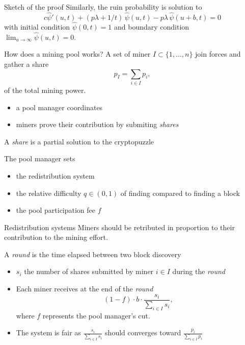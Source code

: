 \documentclass{beamer}
\begin{document}
\begin{frame}[allowframebreaks]{Sketch of the proof}
Similarly, the ruin probability is solution to 
\begin{equation*}\label{psii}
c\widehat{\psi}'(u,t)+(p \lambda+1/t)\,\widehat{\psi}(u,t)-p \lambda\,\widehat{\psi}(u+b,t)=0
\end{equation*}
with initial condition $\widehat{\psi}(0,t)=1$ and boundary condition $\lim_{u\to\infty}\widehat{\psi}(u,t)=0$.
\end{frame}
\begin{frame}{How does a mining pool works?}
\scriptsize
A set of miner $I\subset\{1,\ldots, n\}$ join forces and gather a share 
$$
p_I = \sum_{i\in I }p_i,
$$
of the total mining power. 
\begin{itemize}
  \item a pool manager coordinates
  \item miners prove their contribution by submiting \textit{shares}  
\end{itemize}
\begin{tcolorbox}[enhanced,drop shadow, title=Definition (share)]
A \textit{share} is a partial solution to the cryptopuzzle
\end{tcolorbox}
The pool manager sets
\begin{itemize} 
  \item the redistribution system
  \item the relative difficulty $q\in(0,1)$ of finding compared to finding a block
  \item the pool participation fee $f$
  \end{itemize} 
\end{frame}
\begin{frame}{Redistribution systems}
\scriptsize
Miners should be retributed in proportion to their contribution to the mining effort. 
\begin{tcolorbox}[enhanced,drop shadow, title=Proportional reward system]
A \textit{round} is the time elapsed between two block discovery
\begin{itemize} 
  \item $s_i$ the number of shares submitted by miner $i\in I$ during the \textit{round}
  \item Each miner receives at the end of the \textit{round}
  $$
  (1-f)\cdot b\cdot\frac{s_i}{\sum_{i\in I}s_i},
  $$
  where $f$ represents the pool manager's cut.
  \item The system is fair as $\frac{s_i}{\sum_{i\in I}s_i}$ should converges toward $\frac{p_i}{\sum_{i\in I}p_i}$
\end{itemize}

\end{tcolorbox}
\end{frame}
\end{document}
